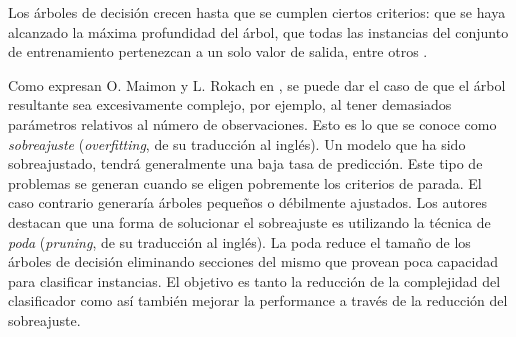 	Los árboles de decisión crecen hasta que se cumplen ciertos criterios: que se haya alcanzado la máxima profundidad del árbol, que todas las ins\-tan\-cias del conjunto de entrenamiento pertenezcan a un solo valor de salida, entre otros \cite{LROM10}.

	Como expresan O. Maimon y L. Rokach en \cite{LROM10}, se puede dar el caso de que el árbol resultante sea excesivamente complejo, por ejemplo, al tener demasiados parámetros relativos al número de observaciones. Esto es lo que se conoce como \textit{sobreajuste} (\textit{overfitting}, de su traducción al inglés). Un modelo que ha sido sobreajustado, tendrá generalmente una baja tasa de predicción. Este tipo de problemas se generan cuando se eligen pobremente los criterios de parada. El caso contrario generaría árboles pequeños o débilmente ajustados. Los autores destacan que una forma de solucionar el sobreajuste es utilizando la técnica de \textit{poda} (\textit{pruning}, de su traducción al inglés). La poda reduce el tamaño de los árboles de decisión eliminando secciones del mismo que provean poca capacidad para clasificar instancias. El objetivo es tanto la reducción de la complejidad del clasificador como así también mejorar la performance a través de la reducción del sobreajuste.
	
